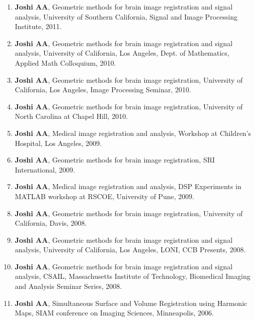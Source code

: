 \documentclass[overlapped,line,letterpaper]{res}
\begin{document}
\begin{resume}
\begin{enumerate}
    \item \textbf{Joshi AA}, Geometric methods for brain image registration and signal analysis, University of Southern California, Signal and Image Processing Institute, 2011.

    \item \textbf{Joshi AA}, Geometric methods for brain image registration and signal analysis, University of California, Los Angeles, Dept. of Mathematics, Applied Math Colloquium, 2010.

    \item \textbf{Joshi AA}, Geometric methods for brain image registration, University of California, Los Angeles, Image Processing Seminar, 2010. 

    \item \textbf{Joshi AA}, Geometric methods for brain image registration, University of North Carolina at Chapel Hill, 2010. 

    \item \textbf{Joshi AA}, Medical image registration and analysis, Workshop at Children's Hospital, Los Angeles, 2009.

    \item \textbf{Joshi AA}, Geometric methods for brain image registration, SRI International, 2009. 

    \item \textbf{Joshi AA}, Medical image registration and analysis, DSP Experiments in MATLAB workshop at RSCOE, University of Pune, 2009.

    \item \textbf{Joshi AA}, Geometric methods for brain image registration, University of California, Davis, 2008.

    \item \textbf{Joshi AA}, Geometric methods for brain image registration and signal analysis, University of California, Los Angeles, LONI, CCB Presents, 2008.

    \item \textbf{Joshi AA}, Geometric methods for brain image registration and signal analysis, CSAIL, Massachusetts Institute of Technology, Biomedical Imaging and Analysis Seminar Series, 2008.

    \item \textbf{Joshi AA}, Simultaneous Surface and Volume Registration using Harmonic Maps, SIAM conference on Imaging Sciences, Minneapolis, 2006.
\end{enumerate}


\end{resume}
\end{document}
